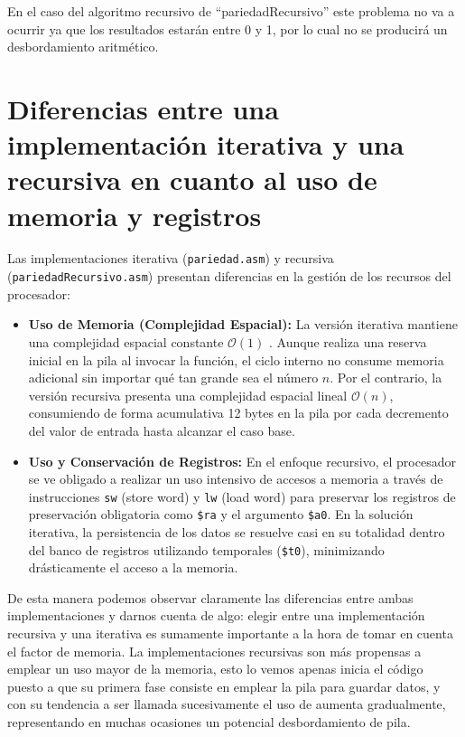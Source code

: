 \documentclass[12pt, a4paper]{article}
\begin{document}
En el caso del algoritmo recursivo de ``pariedadRecursivo'' este problema no va a ocurrir ya que los resultados estarán entre 0 y 1, por lo cual no se producirá un desbordamiento aritmético.

\section{Diferencias entre una implementación iterativa y una recursiva en cuanto al uso de memoria y registros}

Las implementaciones iterativa (\texttt{pariedad.asm}) y recursiva (\texttt{pariedadRecursivo.asm}) presentan diferencias en la gestión de los recursos del procesador:

\begin{itemize}
    \item \textbf{Uso de Memoria (Complejidad Espacial):} 
    La versión iterativa mantiene una complejidad espacial constante $\mathcal{O}(1)$ . Aunque realiza una reserva inicial en la pila al invocar la función, el ciclo interno no consume memoria adicional sin importar qué tan grande sea el número $n$. Por el contrario, la versión recursiva presenta una complejidad espacial lineal $\mathcal{O}(n)$, consumiendo de forma acumulativa 12 bytes en la pila por cada decremento del valor de entrada hasta alcanzar el caso base.
    
    \item \textbf{Uso y Conservación de Registros:} 
    En el enfoque recursivo, el procesador se ve obligado a realizar un uso intensivo de accesos a memoria a través de instrucciones \texttt{sw} (store word) y \texttt{lw} (load word) para preservar los registros de preservación obligatoria como \texttt{\$ra} y el argumento \texttt{\$a0}. En la solución iterativa, la persistencia de los datos se resuelve casi en su totalidad dentro del banco de registros utilizando temporales (\texttt{\$t0}), minimizando drásticamente el acceso a la memoria.
\end{itemize}

De esta manera podemos observar claramente las diferencias entre ambas implementaciones y darnos cuenta de algo: elegir entre una implementación recursiva y una iterativa es sumamente importante a la hora de tomar en cuenta el factor de memoria. La implementaciones recursivas son más propensas a emplear un uso mayor de la memoria, esto lo vemos apenas inicia el código puesto a que su primera fase consiste en emplear la pila para guardar datos, y con su tendencia a ser llamada sucesivamente el uso de aumenta gradualmente, representando en muchas ocasiones un potencial desbordamiento de pila.
\end{document}
